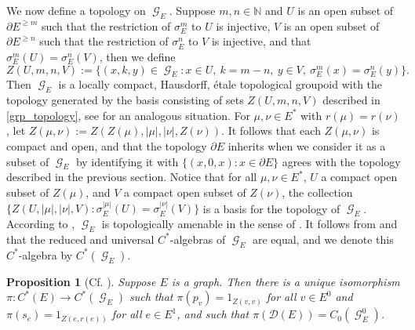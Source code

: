 \documentclass[12pt, a4paper]{amsart}
\numberwithin{equation}{section}
\newtheorem{prop}[thm]{Proposition}
\theoremstyle{definition}
\theoremstyle{remark}
\begin{document}
We now define a topology on ${\operatorname{\mathcal{G}}}_E$. Suppose $m,n\in{\mathbb{N}}$ and $U$ is an open subset of $\partial E^{\ge m}$ such that the restriction of $\sigma_E^m$ to $U$ is injective, $V$ is an open subset of $\partial E^{\ge n}$ such that the restriction of $\sigma_E^n$ to $V$ is injective, and that $\sigma_E^m(U)=\sigma_E^n(V)$, then we define
\begin{equation}\label{grp_topology}
	Z(U,m,n,V):=\{(x,k,y)\in{\operatorname{\mathcal{G}}}_E:x\in U,\ k=m-n,\ y\in V,\ \sigma_E^m(x)=\sigma_E^n(y)\}.
\end{equation}
Then ${\operatorname{\mathcal{G}}}_E$ is a locally compact, Hausdorff, \'{e}tale topological groupoid with the topology generated by the basis consisting of sets $Z(U,m,n,V)$ described in \eqref{grp_topology}, see \cite[Proposition 2.6]{KPRR} for an analogous situation. For $\mu,\nu \in E^*$ with $r(\mu)=r(\nu)$, let $Z(\mu,\nu):=Z(Z(\mu),|\mu|,|\nu|,Z(\nu))$. It follows that each $Z(\mu,\nu)$ is compact and open, and that the topology $\partial E$ inherits when we consider it as a subset of ${\operatorname{\mathcal{G}}}_E$ by identifying it with $\{(x,0,x):x\in\partial E\}$ agrees with the topology described in the previous section. Notice that for all $\mu,\nu \in E^*$, $U$ a compact open subset of $Z(\mu)$, and $V$ a compact open subset of $Z(\nu)$, the collection $\{Z(U,|\mu|,|\nu|,V): \sigma_E^{|\mu|}(U)=\sigma_E^{|\nu|}(V)\}$ is a basis for the topology of ${\operatorname{\mathcal{G}}}_E$. According to \cite[Proposition 6.2]{Yee}, ${\operatorname{\mathcal{G}}}_E$ is topologically amenable in the sense of \cite[Definition 2.2.8]{AR}. It follows from \cite[Proposition 3.3.5]{AR} and \cite[Proposition 6.1.8]{AR} that the reduced and universal $C^*$-algebras of ${\operatorname{\mathcal{G}}}_E$ are equal, and we denote this $C^*$-algebra by $C^*({\operatorname{\mathcal{G}}}_E)$.

\begin{prop}[{Cf. \cite[Proposition 4.1]{KPRR}}]\label{prop:groupoid}
Suppose $E$ is a graph. Then there is a unique isomorphism $\pi:C^*(E) \to C^* 
({\operatorname{\mathcal{G}}}_E)$ such that $\pi(p_v)=1_{Z(v,v)}$ for all $v \in E^0$ and 
$\pi(s_e)=1_{Z(e,r(e))}$ for all $e \in E^1$, and such that 
$\pi(\mathcal{D}(E))=C_0({\operatorname{\mathcal{G}}}_E^0)$.
\end{prop}
\end{document}
